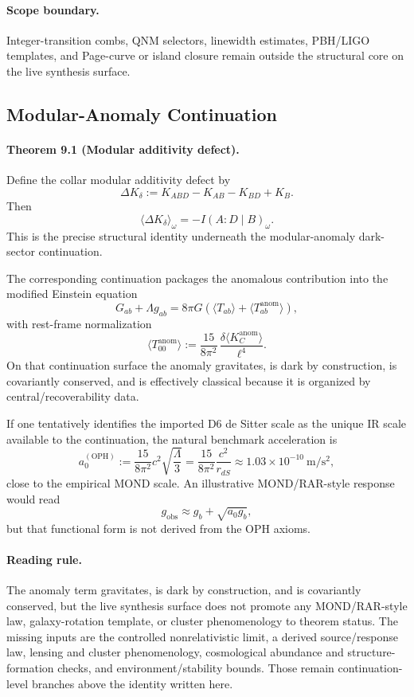 \paragraph{\textbf{Scope boundary.}}
Integer-transition combs, QNM selectors, linewidth estimates, PBH/LIGO templates, and Page-curve
or island closure remain outside the structural core on the live synthesis surface.

\subsection{Modular-Anomaly Continuation}

\paragraph{\textbf{Theorem 9.1 (Modular additivity defect).}}
Define the collar modular additivity defect by
\[
\Delta K_\delta:=K_{ABD}-K_{AB}-K_{BD}+K_B.
\]
Then
\[
\langle \Delta K_\delta\rangle_\omega=-I(A:D\mid B)_\omega.
\]
This is the precise structural identity underneath the modular-anomaly dark-sector continuation.

The corresponding continuation packages the anomalous contribution into the modified Einstein
equation
\[
G_{ab}+\Lambda g_{ab}
=
8\pi G\left(\langle T_{ab}\rangle+\langle T_{ab}^{\mathrm{anom}}\rangle\right),
\]
with rest-frame normalization
\[
\langle T_{00}^{\mathrm{anom}}\rangle
:=
\frac{15}{8\pi^2}\,
\frac{\delta\langle K_C^{\mathrm{anom}}\rangle}{\ell^4}.
\]
On that continuation surface the anomaly gravitates, is dark by construction, is covariantly
conserved, and is effectively classical because it is organized by central/recoverability data.

If one tentatively identifies the imported D6 de Sitter scale as the unique IR scale available to
the continuation, the natural benchmark acceleration is
\[
a_0^{(\mathrm{OPH})}
:=
\frac{15}{8\pi^2}c^2\sqrt{\frac{\Lambda}{3}}
=
\frac{15}{8\pi^2}\frac{c^2}{r_{dS}}
\approx
1.03\times 10^{-10}\ \mathrm{m/s^2},
\]
close to the empirical MOND scale. An illustrative MOND/RAR-style response would read
\[
g_{\mathrm{obs}}\approx g_b+\sqrt{a_0 g_b},
\]
but that functional form is not derived from the OPH axioms.

\paragraph{\textbf{Reading rule.}}
The anomaly term gravitates, is dark by construction, and is covariantly conserved, but the live
synthesis surface does not promote any MOND/RAR-style law, galaxy-rotation template, or cluster
phenomenology to theorem status. The missing inputs are the controlled nonrelativistic limit, a
derived source/response law, lensing and cluster phenomenology, cosmological abundance and
structure-formation checks, and environment/stability bounds. Those remain continuation-level
branches above the identity written here.
